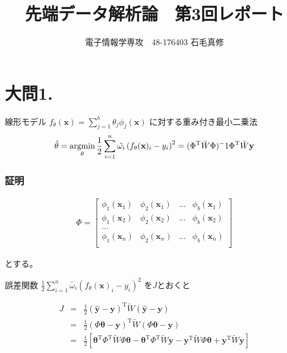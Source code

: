 \documentclass[fleqn]{jsarticle}
\begin{document}
\newcommand{\argmax}{\mathop{\rm argmax}\limits}
\newcommand{\argmin}{\mathop{\rm argmin}\limits}

\title{先端データ解析論　第3回レポート}
\author{電子情報学専攻　48-176403 石毛真修}
\maketitle



\section*{大問1.}
線形モデル $f_\theta(\mathbf x) = \sum^b_{j=1} \theta_j \phi_j(\mathbf x)$
に対する重み付き最小二乗法
\begin{eqnarray*}
  \hat{\theta} = \argmin_\theta \frac{1}{2} \sum^n_{i=1} \tilde{\omega_i} \left(f_\theta(\mathbf x)_i - y_i\right)^2
  = (\Phi^{\mathrm T} \tilde{W} \Phi)^-1 \Phi^{\mathrm T} \tilde{W} \mathbf{y}
\end{eqnarray*}

\subsubsection*{証明}
\begin{eqnarray*}
  \Phi = \begin{bmatrix}
    \phi_1({\mathbf x}_1) &\phi_2({\mathbf x}_1) &... &\phi_b({\mathbf x}_1)\\
    \phi_1({\mathbf x}_2) &\phi_2({\mathbf x}_2) &... &\phi_b({\mathbf x}_2)\\
    ...\\
    \phi_1({\mathbf x}_n) &\phi_2({\mathbf x}_n) &... &\phi_b({\mathbf x}_n)\\
  \end{bmatrix}
\end{eqnarray*}


とする。


誤差関数 $\frac{1}{2} \sum^n_{i=1} \tilde{\omega_i} \left(f_\theta(\mathbf x)_i - y_i\right)^2$ を$J$とおくと

\begin{eqnarray*}
  J &=& \frac{1}{2} (\hat{\mathbf y} - \mathbf y)^{\mathrm T} \tilde W (\hat{\mathbf y} - \mathbf y)\\
  &=& \frac{1}{2} (\Phi \mathbf \theta - \mathbf y)^{\mathrm T} \tilde W (\Phi \mathbf \theta - \mathbf y)\\
  &=& \frac{1}{2} \left[ \mathbf{\theta}^\mathrm{T} \Phi^\mathrm{T} \tilde W \Phi \mathbf \theta
    - \mathbf{\theta}^\mathrm{T} \Phi^\mathrm{T} \tilde W \mathbf y - \mathbf{y}^{\mathrm T} \tilde W \Phi \mathbf \theta
    + \mathbf{y}^{\mathrm T} \tilde W \mathbf y \right]
\end{eqnarray*}
\end{document}
